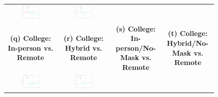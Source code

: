 \documentclass[9pt,twoside,lineno]{pnas-new}
\theoremstyle{definition}
\begin{document}
\begin{figure}[!ht]
{\begin{minipage}{\linewidth}
\begin{tabular}{cccc}
 \includegraphics[width=0.4\textwidth]{tables_and_figures/event_church_csfullno.pdf}& \includegraphics[width=0.4\textwidth]{tables_and_figures/event_church_cshybridno.pdf}  \smallskip\\ 
  \textbf{(q) College: In-person vs. Remote }&\textbf{(r) College: Hybrid vs. Remote}&\textbf{(s) College: In-person/No-Mask vs. Remote}&\textbf{(t) College:  Hybrid/No-Mask vs. Remote}\smallskip\\ 
 \includegraphics[width=0.4\textwidth]{tables_and_figures/event_college_csfull.pdf}& \includegraphics[width=0.4\textwidth]{tables_and_figures/event_college_cshybrid.pdf} 
 &

\end{tabular}
\end{minipage}}
\end{figure}
\end{document}

